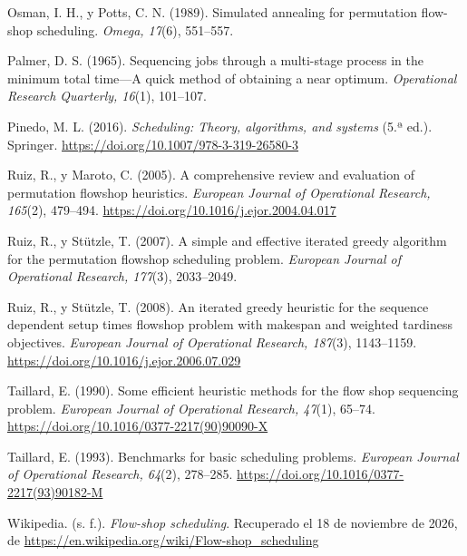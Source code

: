 \begin{list}{}{\setlength{\leftmargin}{0.5in}\setlength{\itemindent}{-0.5in}%
  \setlength{\itemsep}{0pt}\setlength{\parsep}{0pt}\setlength{\topsep}{0pt}}
\item Osman, I. H., y Potts, C. N. (1989). Simulated annealing for permutation flow-shop
scheduling. \textit{Omega, 17}(6), 551--557.

\item Palmer, D. S. (1965). Sequencing jobs through a multi-stage process in the minimum total
time---A quick method of obtaining a near optimum. \textit{Operational Research Quarterly,
16}(1), 101--107.

\item Pinedo, M. L. (2016). \textit{Scheduling: Theory, algorithms, and systems} (5.ª ed.).
Springer. \url{https://doi.org/10.1007/978-3-319-26580-3}

\item Ruiz, R., y Maroto, C. (2005). A comprehensive review and evaluation of permutation
flowshop heuristics. \textit{European Journal of Operational Research, 165}(2), 479--494.
\url{https://doi.org/10.1016/j.ejor.2004.04.017}

\item Ruiz, R., y Stützle, T. (2007). A simple and effective iterated greedy algorithm for the
permutation flowshop scheduling problem. \textit{European Journal of Operational Research,
177}(3), 2033--2049.

\item Ruiz, R., y Stützle, T. (2008). An iterated greedy heuristic for the sequence dependent
setup times flowshop problem with makespan and weighted tardiness objectives.
\textit{European Journal of Operational Research, 187}(3), 1143--1159.
\url{https://doi.org/10.1016/j.ejor.2006.07.029}

\item Taillard, E. (1990). Some efficient heuristic methods for the flow shop sequencing
problem. \textit{European Journal of Operational Research, 47}(1), 65--74.
\url{https://doi.org/10.1016/0377-2217(90)90090-X}

\item Taillard, E. (1993). Benchmarks for basic scheduling problems. \textit{European Journal
of Operational Research, 64}(2), 278--285.
\url{https://doi.org/10.1016/0377-2217(93)90182-M}

\item Wikipedia. (s. f.). \textit{Flow-shop scheduling}. Recuperado el 18 de noviembre de
2026, de \url{https://en.wikipedia.org/wiki/Flow-shop_scheduling}

\end{list}

\newpage
